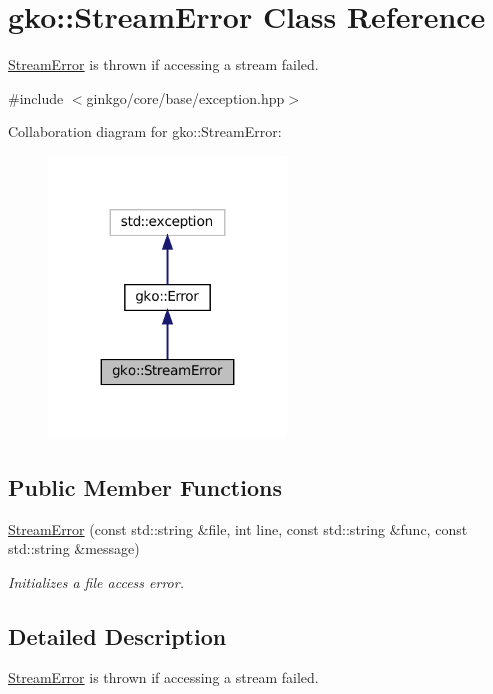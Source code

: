 \hypertarget{classgko_1_1StreamError}{}\section{gko\+:\+:Stream\+Error Class Reference}
\label{classgko_1_1StreamError}


\hyperlink{classgko_1_1StreamError}{Stream\+Error} is thrown if accessing a stream failed.  




{\ttfamily \#include $<$ginkgo/core/base/exception.\+hpp$>$}



Collaboration diagram for gko\+:\+:Stream\+Error\+:
\nopagebreak
\begin{figure}[H]
\begin{center}
\leavevmode
\includegraphics[width=179pt]{classgko_1_1StreamError__coll__graph}
\end{center}
\end{figure}
\subsection*{Public Member Functions}
\begin{DoxyCompactItemize}
\item 
\hyperlink{classgko_1_1StreamError_a511af28ae0b5a98998ef96f21cf1863e}{Stream\+Error} (const std\+::string \&file, int line, const std\+::string \&func, const std\+::string \&message)
\begin{DoxyCompactList}\small\item\em Initializes a file access error. \end{DoxyCompactList}\end{DoxyCompactItemize}


\subsection{Detailed Description}
\hyperlink{classgko_1_1StreamError}{Stream\+Error} is thrown if accessing a stream failed. 

